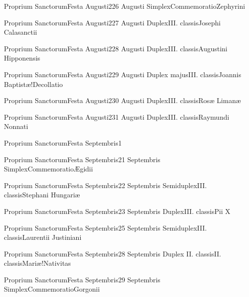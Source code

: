 \documentclass[invitatoriale-romanum.tex]{subfiles}
\begin{document}
	{Proprium Sanctorum}{Festa Augusti}{2}{26 Augusti}
	{Simplex}{Commemoratio}{Zephyrini}
	{}
	{\invitferia}

	{Proprium Sanctorum}{Festa Augusti}{2}{27 Augusti}
	{Duplex}{III. classis}{Josephi Calasanctii}
	{}
	{}

	{Proprium Sanctorum}{Festa Augusti}{2}{28 Augusti}
	{Duplex}{III. classis}{Augustini Hipponensis}
	{}
	{}

	{Proprium Sanctorum}{Festa Augusti}{2}{29 Augusti}
	{Duplex majus}{III. classis}{Joannis Baptistæ!Decollatio}
	{}
	{}

	{Proprium Sanctorum}{Festa Augusti}{2}{30 Augusti}
	{Duplex}{III. classis}{Rosæ Limanæ}
	{}
	{}

	{Proprium Sanctorum}{Festa Augusti}{2}{31 Augusti}
	{Duplex}{III. classis}{Raymundi Nonnati}
	{}
	{}


	{Proprium Sanctorum}{Festa Septembris}{1}{}
	{}{}{}{}{}

	{Proprium Sanctorum}{Festa Septembris}{2}{1 Septembris}
	{Simplex}{Commemoratio}{Ægidii}
	{}
	{\invitferia}

	{Proprium Sanctorum}{Festa Septembris}{2}{2 Septembris}
	{Semiduplex}{III. classis}{Stephani Hungariæ}
	{}
	{}

	{Proprium Sanctorum}{Festa Septembris}{2}{3 Septembris}
	{Duplex}{III. classis}{Pii X}
	{}
	{}

	{Proprium Sanctorum}{Festa Septembris}{2}{5 Septembris}
	{Semiduplex}{III. classis}{Laurentii Justiniani}
	{}
	{}

	{Proprium Sanctorum}{Festa Septembris}{2}{8 Septembris}
	{Duplex II. classis}{II. classis}{Mariæ!Nativitas}
	{}
	{}

	{Proprium Sanctorum}{Festa Septembris}{2}{9 Septembris}
	{Simplex}{Commemoratio}{Gorgonii}
	{}
	{\invitferia}
\end{document}
